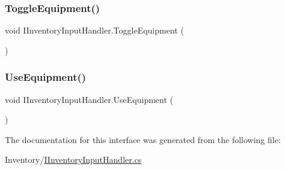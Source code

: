 \mbox{\label{interface_i_inventory_input_handler_abc015c2f9db63a1851e774fc404892e2}} 
\subsubsection{\texorpdfstring{Toggle\+Equipment()}{ToggleEquipment()}}
{\footnotesize\ttfamily void I\+Inventory\+Input\+Handler.\+Toggle\+Equipment (\begin{DoxyParamCaption}{ }\end{DoxyParamCaption})}

\mbox{\label{interface_i_inventory_input_handler_af0d5cde1c1cf40e364a695e0a0660f68}} 
\subsubsection{\texorpdfstring{Use\+Equipment()}{UseEquipment()}}
{\footnotesize\ttfamily void I\+Inventory\+Input\+Handler.\+Use\+Equipment (\begin{DoxyParamCaption}{ }\end{DoxyParamCaption})}



The documentation for this interface was generated from the following file\+:\begin{DoxyCompactItemize}
\item 
Inventory/\mbox{\hyperlink{_i_inventory_input_handler_8cs}{I\+Inventory\+Input\+Handler.\+cs}}\end{DoxyCompactItemize}
